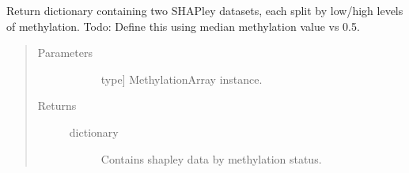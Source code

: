 \documentclass[letterpaper,10pt,english]{sphinxmanual}
\begin{document}
\begin{fulllineitems}
\begin{fulllineitems}
\begin{quote}
\begin{description}
\end{description}\end{quote}

\end{fulllineitems}


\begin{fulllineitems}
\label{\detokenize{index:methylnet.interpretation_classes.ShapleyDataExplorer.return_shapley_data_by_methylation_status}}
Return dictionary containing two SHAPley datasets, each split by low/high levels of methylation. Todo: Define this using median methylation value vs 0.5.
\begin{quote}\begin{description}
\item[{Parameters}] \leavevmode\begin{description}
\item[{}] \leavevmode{[}type{]}
MethylationArray instance.

\end{description}

\item[{Returns}] \leavevmode\begin{description}
\item[{dictionary}] \leavevmode
Contains shapley data by methylation status.

\end{description}

\end{description}\end{quote}

\end{fulllineitems}



\end{fulllineitems}
\end{document}
